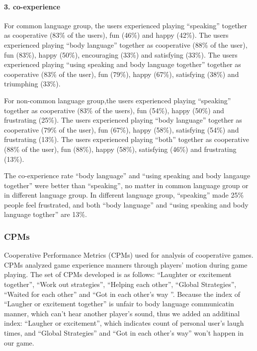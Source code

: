 \paragraph{3. co-experience}

For common language group, the users experienced playing ``speaking'' together as cooperative (83\% of the users), fun (46\%) and happy (42\%). The users experienced playing ``body language'' together as cooperative (88\% of the user), fun (83\%), happy (50\%), encouraging (33\%) and satisfying (33\%). The users experienced playing ``using speaking and body language together'' together as cooperative (83\% of the user), fun (79\%), happy (67\%), satisfying (38\%) and triumphing (33\%).

For non-common language group,the users experienced playing “speaking” together as cooperative (83\% of the users), fun (54\%), happy (50\%) and frustrating (25\%). The users experienced playing “body language” together as cooperative (79\% of the user), fun (67\%), happy (58\%), satisfying (54\%) and frustrating (13\%). The users experienced playing “both” together as cooperative (88\% of the user), fun (88\%), happy (58\%), satisfying (46\%) and frustrating (13\%). 

The co-experience rate ``body language'' and ``using speaking and body langauge together'' were better than ``speaking'', no matter in common language group or in different language group. In different language group, ``speaking'' made 25\% people feel frustrated, and both ``body language'' and ``using speaking and body language togther'' are 13\%.

\subsubsection{CPMs}

Cooperative Performance Metrics (CPMs)\cite{CPMs} used for analysis of cooperative games. CPMs analyzed game experience manners through players' motion during game playing. The set of CPMs developed is as follows: ``Laughter or excitement together'', ``Work out strategies'', ``Helping each other'', ``Global Strategies'', ``Waited for each other'' and ``Got in each other's way ''. Because the index of ``Laugher or excitement together'' is unfair to body language communicatin manner, which can't hear another player's sound, thus we added an additinal index: ``Laugher or excitement'', which indicates count of personal user's laugh times, and ``Global Strategies'' and ``Got in each other's way'' won't happen in our game.

